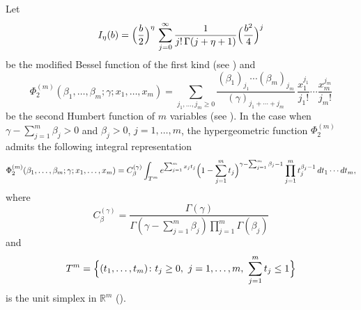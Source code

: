 \documentclass[12pt,twoside,reqno]{amsart}\usepackage[cp1251]{inputenc}
\theoremstyle{plain}
\theoremstyle{remark}
\begin{document}


Let
\[
I_{\eta}(b)=\Bigl(\frac{b}{2}\Bigr)^{\eta}\,\sum_{j=0}^{\infty}\frac{1}{j!\,\Gamma(j+\eta+1)}\Bigl(\frac{b^2}{4}\Bigl)^j
\]
be the modified Bessel function of the first kind (see \cite[Chapt. 7, 7.2.2]{BE53a}) and\[
\Phi_2^{(m)}(\beta_1,\dots,\beta_m;\gamma;x_1,\dots,x_m)=
\sum_{j_1,\dots,j_m\ge 0}\frac{(\beta_1)_{j_1}\cdots (\beta_m)_{j_m}}{(\gamma)_{j_1+\cdots+j_m}}\,\frac{x_1^{j_1}}{j_{1}!}\cdots\frac{x_m^{j_m}}{j_{m}!}
\]
be the second Humbert function of $m$ variables (see \cite[Chapt. 2, 2.1.1.2]{Ex83}).
In the case when $\gamma-\sum_{j=1}^m\beta_j>0$ and  $\beta_j>0$, $j=1,\dots,m$, %
the hypergeometric
function $\Phi_2^{(m)}$ admits the following integral representation
\begin{equation}\label{eq18}
\Phi_2^{(m)}(\beta_1,\dots,\beta_m;\gamma;x_1,\dots,x_m)
=C_{\beta}^{(\gamma)}\int_{T^m}e^{\sum_{j=1}^mx_jt_j}\Bigl(1-\sum_{j=1}^{m}t_j\Bigr)^{\gamma-\sum_{j=1}^m\beta_j-1}
\prod_{j=1}^{m}t_j^{\beta_j-1}\,dt_1\cdots dt_m,
\end{equation}
where
\[
C_{\beta}^{(\gamma)}=\frac{\Gamma(\gamma)}{\Gamma(\gamma-\sum_{j=1}^{m}\beta_j)\prod_{j=1}^{m}\Gamma(\beta_j)}
\]
and
\[
T^m=\Bigl\{(t_1,\dots,t_m)\colon t_j\ge 0,\ j=1,\dots,m,\ \sum_{j=1}^{m}t_j\le 1\Bigr\}
\]
is the unit simplex in $\mathbb{R}^m$ (\cite{CW09,Hu20}).
\end{document}
